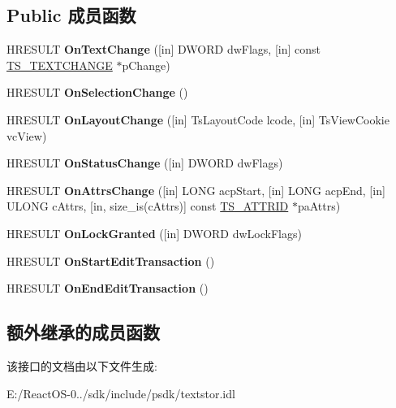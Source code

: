 \subsection*{Public 成员函数}
\begin{DoxyCompactItemize}
\item 
\mbox{\label{interface_i_text_store_a_c_p_sink_a82966b0eb84828dd8c264eb81aa02115}} 
H\+R\+E\+S\+U\+LT {\bfseries On\+Text\+Change} (\mbox{[}in\mbox{]} D\+W\+O\+RD dw\+Flags, \mbox{[}in\mbox{]} const \hyperlink{struct_t_s___t_e_x_t_c_h_a_n_g_e}{T\+S\+\_\+\+T\+E\+X\+T\+C\+H\+A\+N\+GE} $\ast$p\+Change)
\item 
\mbox{\label{interface_i_text_store_a_c_p_sink_acf37e366f4eb016dc1f14e3a5a4d5d5e}} 
H\+R\+E\+S\+U\+LT {\bfseries On\+Selection\+Change} ()
\item 
\mbox{\label{interface_i_text_store_a_c_p_sink_afc847ab39777b33375a925545e330e46}} 
H\+R\+E\+S\+U\+LT {\bfseries On\+Layout\+Change} (\mbox{[}in\mbox{]} Ts\+Layout\+Code lcode, \mbox{[}in\mbox{]} Ts\+View\+Cookie vc\+View)
\item 
\mbox{\label{interface_i_text_store_a_c_p_sink_a35c90aa62da3db1676878bafdc71a9cf}} 
H\+R\+E\+S\+U\+LT {\bfseries On\+Status\+Change} (\mbox{[}in\mbox{]} D\+W\+O\+RD dw\+Flags)
\item 
\mbox{\label{interface_i_text_store_a_c_p_sink_a3ad8a8542ae80bee46012b7c31eeee55}} 
H\+R\+E\+S\+U\+LT {\bfseries On\+Attrs\+Change} (\mbox{[}in\mbox{]} L\+O\+NG acp\+Start, \mbox{[}in\mbox{]} L\+O\+NG acp\+End, \mbox{[}in\mbox{]} U\+L\+O\+NG c\+Attrs, \mbox{[}in, size\+\_\+is(c\+Attrs)\mbox{]} const \hyperlink{interface_g_u_i_d}{T\+S\+\_\+\+A\+T\+T\+R\+ID} $\ast$pa\+Attrs)
\item 
\mbox{\label{interface_i_text_store_a_c_p_sink_a6fdb431ea6184e469f7068fd2e11bb68}} 
H\+R\+E\+S\+U\+LT {\bfseries On\+Lock\+Granted} (\mbox{[}in\mbox{]} D\+W\+O\+RD dw\+Lock\+Flags)
\item 
\mbox{\label{interface_i_text_store_a_c_p_sink_aef824b8c42e09726796fa3ef26fa2f19}} 
H\+R\+E\+S\+U\+LT {\bfseries On\+Start\+Edit\+Transaction} ()
\item 
\mbox{\label{interface_i_text_store_a_c_p_sink_adb4eace69d1caf7ce2273dbd478d5c32}} 
H\+R\+E\+S\+U\+LT {\bfseries On\+End\+Edit\+Transaction} ()
\end{DoxyCompactItemize}
\subsection*{额外继承的成员函数}


该接口的文档由以下文件生成\+:\begin{DoxyCompactItemize}
\item 
E\+:/\+React\+O\+S-\/0../sdk/include/psdk/textstor.\+idl\end{DoxyCompactItemize}
